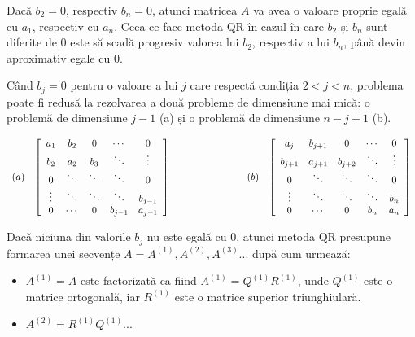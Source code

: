 \documentclass{exam}
\begin{document}
Dacă $b_{2} = 0$, respectiv $b_{n} = 0$, atunci matricea $A$ va avea o valoare proprie egală cu $a_{1}$, respectiv cu $a_{n}$. Ceea ce face metoda QR în cazul în care $b_{2}$ și $b_{n}$ sunt diferite de $0$ este să scadă progresiv valorea lui $b_{2}$, respectiv a lui $b_{n}$, până devin aproximativ egale cu $0$.

Când $b_{j} = 0$ pentru o valoare a lui $j$ care respectă condiția $2 < j < n$, problema poate fi redusă la \mbox{rezolvarea} a două probleme de dimensiune mai mică: o problemă de dimensiune $j-1$ (a) și o problemă de dimensiune $n-j+1$ (b).

\begin{equation*}
	\begin{array}{cccc}
		(a)                                             &
		\left [\begin{array}{ccccc}
				       a_{1}  & b_{2}  & 0      & \cdots  & 0       \\
				       b_{2}  & a_{2}  & b_{3}  & \ddots  & \vdots  \\
				       0      & \ddots & \ddots & \ddots  & 0       \\
				       \vdots & \ddots & \ddots & \ddots  & b_{j-1} \\
				       0      & \cdots & 0      & b_{j-1} & a_{j-1} \\
			       \end{array} \right] \hspace{0.2\textwidth} &
		(b)                                             &
		\left [\begin{array}{ccccc}
				       a_{j}   & b_{j+1} & 0       & \cdots & 0      \\
				       b_{j+1} & a_{j+1} & b_{j+2} & \ddots & \vdots \\
				       0       & \ddots  & \ddots  & \ddots & 0      \\
				       \vdots  & \ddots  & \ddots  & \ddots & b_{n}  \\
				       0       & \cdots  & 0       & b_{n}  & a_{n}  \\
			       \end{array} \right]
	\end{array}
\end{equation*}


Dacă niciuna din valorile $b_{j}$ nu este egală cu 0, atunci metoda QR presupune formarea unei secvențe $A = A^{(1)}, A^{(2)}, A^{(3)}$... după cum urmează:

\begin{itemize}
	\item
	      $A^{(1)} = A$ este factorizată ca fiind $A^{(1)} = Q^{(1)}R^{(1)}$, unde $Q^{(1)}$ este o matrice ortogonală, iar $R^{(1)}$ este o matrice superior triunghiulară.
	\item
	      $A^{(2)} = R^{(1)}Q^{(1)}$...
\end{itemize}
\end{document}
